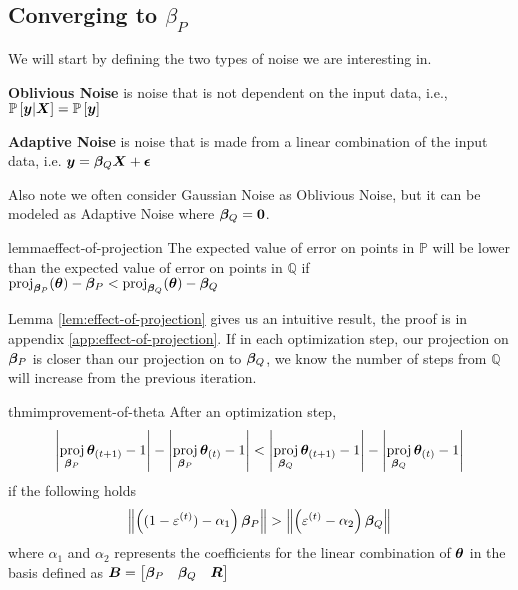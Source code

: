 \documentclass{article} %
\DeclareMathOperator{\proj}{proj}
\newcommand{\norm}[1]{\left\lVert#1\right\rVert}
\begin{document}
	\subsection{Converging to $\beta_P$}
	
	We will start by defining the two types of noise we are interesting in. 
	\begin{definition}
		\textbf{Oblivious Noise} is noise that is not dependent on the input data, i.e., $\displaystyle \mathbb{P}\left[{\bm{y}} | {\bm{X}}\right] = \mathbb{P}\left[{\bm{y}}\right]$
	\end{definition}
	\begin{definition}
		\textbf{Adaptive Noise} is noise that is made from a linear combination of the input data, i.e. $\displaystyle {\bm{y}} = {\bm{\beta}}_Q{\bm{X}} + {\bm{{\epsilon}}}$
	\end{definition}
	Also note we often consider Gaussian Noise as Oblivious Noise, but it can be modeled as Adaptive Noise where ${\bm{\beta}}_Q = {\bm{0}}$. 

	\begin{restatable}{lemma}{effect-of-projection}
		\label{lem:effect-of-projection}
		The expected value of error on points in $\mathbb{P}$ will be lower than the expected value of error on points in $\mathbb{Q}$ if $\proj_{\vbeta_P}(\vtheta) - \vbeta_P < \proj_{\vbeta_Q}(\vtheta) - \vbeta_Q$
	\end{restatable}
	
	Lemma \ref{lem:effect-of-projection} gives us an intuitive result, the proof is in appendix \ref{app:effect-of-projection}. If in each optimization step, our projection on ${\bm{\beta}}_P$ is closer than our projection on to ${\bm{\beta}}_Q$, we know the number of steps from $\mathbb{Q}$ will increase from the previous iteration.
	\begin{restatable}{thm}{improvement-of-theta}
		\label{thm:improvement-of-theta}
		After an optimization step, 
		\begin{equation*}
			\left|\proj_{\vbeta_P}\vtheta_{(t+1)} -1 \right| - \left|\proj_{\vbeta_P}\vtheta_{(t)} -1 \right| <  \left|\proj_{\vbeta_Q}\vtheta_{(t+1)} - 1\right| - \left|\proj_{\vbeta_Q}\vtheta_{(t)} - 1\right|
		\end{equation*}
			  if the following holds
		\begin{equation}
			\norm{\left((1-\varepsilon^{(t)}) - \alpha_1\right)\vbeta_P} > \norm{\left(\varepsilon^{(t)} - \alpha_2\right)\vbeta_Q}
		\end{equation}
		where $\alpha_1$ and $\alpha_2$ represents the coefficients for the linear combination of ${\bm{\theta}}$ in the basis defined as ${\bm{B}} = \begin{bmatrix} {\bm{\beta}}_P & {\bm{\beta}}_Q & {\bm{R}}\end{bmatrix}$
	\end{restatable}
\end{document}
